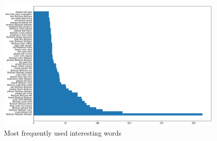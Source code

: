 \documentclass[sigconf]{acmart}
\begin{document}
\begin{figure}[bp]
        \centering
        \includegraphics[scale=0.5]{project/images/trigram_interesting.png}  
        \caption{Most frequently used interesting words} 
          \label{fig:tri_int}   
\end{figure}



%
\end{document}
